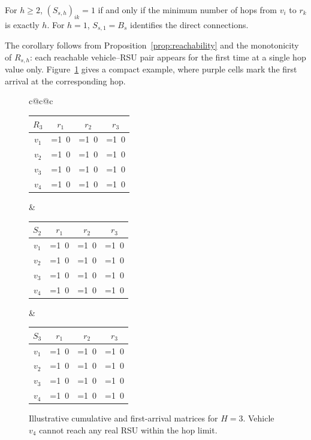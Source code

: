 \documentclass[engproc,proceedingpaper,submit,oneauthor]{Definitions/mdpi}
\begin{document}
	\begin{Corollary}\label{cor:minhop}
		For $h\ge 2$, $(S_{s,h})_{ik}=1$ if and only if the minimum number of hops from $v_i$
		to $r_k$ is exactly $h$. For $h=1$, $S_{s,1}=B_s$ identifies the direct connections.
	\end{Corollary}
	
	The corollary follows from Proposition~\ref{prop:reachability} and the monotonicity of
	$R_{s,h}$: each reachable vehicle--RSU pair appears for the first time at a single hop
	value only. Figure~\ref{fig:matrices} gives a compact example, where purple cells mark
	the first arrival at the corresponding hop.
	
	\begin{figure}[H]
		\centering
		\newcommand{\hc}[1]{\ifnum#1=1\cellcolor{violet!60}\textcolor{white}{1}\else\cellcolor{gray!8}0\fi}
		\small
		\begin{tabular}{c@{\hskip 6mm}c@{\hskip 6mm}c}
			\begin{tabular}{c|ccc}
				$R_3$ & $r_1$ & $r_2$ & $r_3$\\\hline
				$v_1$ & \hc1 & \hc1 & \hc1\\
				$v_2$ & \hc1 & \hc1 & \hc1\\
				$v_3$ & \hc1 & \hc1 & \hc1\\
				$v_4$ & \hc0 & \hc0 & \hc0
			\end{tabular}&
			\begin{tabular}{c|ccc}
				$S_2$ & $r_1$ & $r_2$ & $r_3$\\\hline
				$v_1$ & \hc0 & \hc0 & \hc1\\
				$v_2$ & \hc1 & \hc1 & \hc0\\
				$v_3$ & \hc0 & \hc0 & \hc1\\
				$v_4$ & \hc0 & \hc0 & \hc0
			\end{tabular}&
			\begin{tabular}{c|ccc}
				$S_3$ & $r_1$ & $r_2$ & $r_3$\\\hline
				$v_1$ & \hc0 & \hc1 & \hc0\\
				$v_2$ & \hc0 & \hc0 & \hc0\\
				$v_3$ & \hc1 & \hc0 & \hc0\\
				$v_4$ & \hc0 & \hc0 & \hc0
			\end{tabular}
		\end{tabular}
		\caption{Illustrative cumulative and first-arrival matrices for $H=3$. Vehicle $v_4$
			cannot reach any real RSU within the hop limit.}\label{fig:matrices}
	\end{figure}
	
\end{document}
